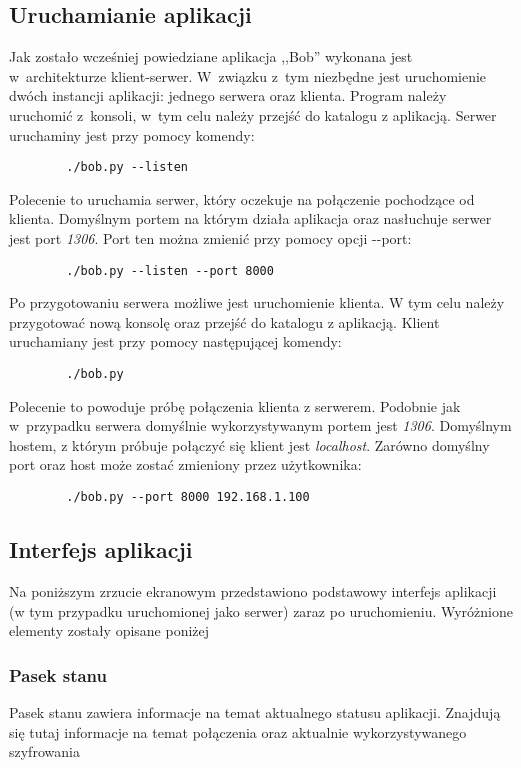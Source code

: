 \documentclass{article}
\begin{document}
  \subsection{Uruchamianie aplikacji}
    Jak zostało wcześniej powiedziane aplikacja ,,Bob'' wykonana jest w~architekturze klient-serwer. W~związku 
    z~tym niezbędne jest uruchomienie dwóch instancji aplikacji: jednego serwera oraz klienta. Program należy 
    uruchomić z~konsoli, w~tym celu należy przejść do katalogu z aplikacją. Serwer uruchaminy jest przy pomocy 
    komendy:
      \begin{lstlisting}
        ./bob.py --listen
      \end{lstlisting}
    Polecenie to uruchamia serwer, który oczekuje na połączenie pochodzące od klienta. Domyślnym portem na którym
    działa aplikacja oraz nasłuchuje serwer jest port \emph{1306}. Port ten można zmienić przy pomocy opcji 
    -{}-port:
      \begin{lstlisting}
        ./bob.py --listen --port 8000
      \end{lstlisting}
    Po przygotowaniu serwera możliwe jest uruchomienie klienta. W tym celu należy przygotować nową konsolę oraz
    przejść do katalogu z aplikacją. Klient uruchamiany jest przy pomocy następującej komendy:
      \begin{lstlisting}
        ./bob.py
      \end{lstlisting}
    Polecenie to powoduje próbę połączenia klienta z serwerem. Podobnie jak w~przypadku serwera domyślnie 
    wykorzystywanym portem jest \emph{1306}. Domyślnym hostem, z którym próbuje połączyć się klient jest
    \emph{localhost}. Zarówno domyślny port oraz host może zostać zmieniony przez użytkownika:
      \begin{lstlisting}
        ./bob.py --port 8000 192.168.1.100
      \end{lstlisting}

  \subsection{Interfejs aplikacji}
    Na poniższym zrzucie ekranowym przedstawiono podstawowy interfejs aplikacji (w tym przypadku uruchomionej jako
    serwer) zaraz po uruchomieniu. Wyróżnione elementy zostały opisane poniżej
    \subsubsection{Pasek stanu}
      Pasek stanu zawiera informacje na temat aktualnego statusu aplikacji. Znajdują się tutaj informacje na temat
      połączenia oraz aktualnie wykorzystywanego szyfrowania
\end{document}

